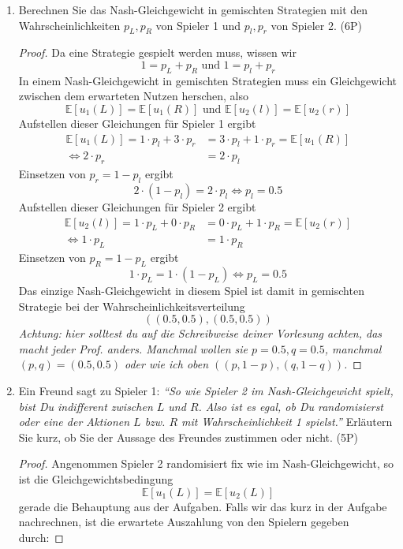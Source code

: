 \documentclass[12pt]{article}
\begin{document}
\begin{enumerate}[label=\alph*\upshape)]
\begin{proof}
			Das heißt hier gibt es kein Nash-Gleichgewicht in reinen Strategien.
		\end{proof}
	\item Berechnen Sie das Nash-Gleichgewicht in gemischten Strategien mit den Wahrscheinlichkeiten $p_L, p_R$ von Spieler 1 und $p_l, p_r$ von Spieler 2. (6P)
		\begin{proof}
			Da eine Strategie gespielt werden muss, wissen wir
			$$ 1 = p_L + p_R \text{ und } 1 = p_l + p_r $$
			In einem Nash-Gleichgewicht in gemischten Strategien muss ein Gleichgewicht zwischen dem erwarteten Nutzen herschen, also
			$$ \mathbb{E}[u_1(L)] = \mathbb{E}[u_1(R)] \text{ und } \mathbb{E}[u_2(l)] = \mathbb{E}[u_2(r)] $$ 
			Aufstellen dieser Gleichungen für Spieler 1 ergibt
			\begin{align*}
				\mathbb{E}[u_1(L)]  = 1 \cdot p_l + 3 \cdot p_r & = 3 \cdot p_l + 1 \cdot p_r = \mathbb{E}[u_1(R)] \\
				\iff 2 \cdot p_r & = 2 \cdot p_l
			\end{align*}
			Einsetzen von $p_r = 1 - p_l$ ergibt
			$$ 2 \cdot (1 - p_l) = 2 \cdot p_l \iff p_l = 0.5 $$
			Aufstellen dieser Gleichungen für Spieler 2 ergibt
			\begin{align*}
				\mathbb{E}[u_2(l)]  = 1 \cdot p_L + 0 \cdot p_R & = 0 \cdot p_L + 1 \cdot p_R = \mathbb{E}[u_2(r)] \\
				\iff 1 \cdot p_L & = 1 \cdot p_R
			\end{align*}
			Einsetzen von $p_R = 1 - p_L$ ergibt
			$$ 1 \cdot p_L = 1 \cdot (1 - p_L) \iff p_L = 0.5 $$
			Das einzige Nash-Gleichgewicht in diesem Spiel ist damit in gemischten Strategie bei der Wahrscheinlichkeitsverteilung 
			$$ \left( (0.5, 0.5), (0.5, 0.5) \right) $$
			\textit{Achtung: hier solltest du auf die Schreibweise deiner Vorlesung achten, das macht jeder Prof. anders. Manchmal wollen sie $p = 0.5, q= 0.5$, manchmal $(p, q) = (0.5,0.5)$ oder wie ich oben $( (p, 1-p), (q, 1-q) )$.}
		\end{proof}
	\item Ein Freund sagt zu Spieler 1: \textit{\enquote{So wie Spieler 2 im Nash-Gleichgewicht spielt, bist Du indifferent zwischen $L$ und $R$. Also ist es egal, ob Du randomisierst oder eine der Aktionen $L$ bzw. $R$ mit Wahrscheinlichkeit 1 spielst.}} Erläutern Sie kurz, ob Sie der Aussage des Freundes zustimmen oder nicht. (5P)
		\begin{proof}
			Angenommen Spieler 2 randomisiert fix wie im Nash-Gleichgewicht, so ist die Gleichgewichtsbedingung
			$$ \mathbb{E}[u_1(L)] = \mathbb{E}[u_2(L)] $$
			gerade die Behauptung aus der Aufgaben. Falls wir das kurz in der Aufgabe nachrechnen, ist die erwartete Auszahlung von den Spielern gegeben durch: 
						

\end{proof}
\end{enumerate}
\end{document}

